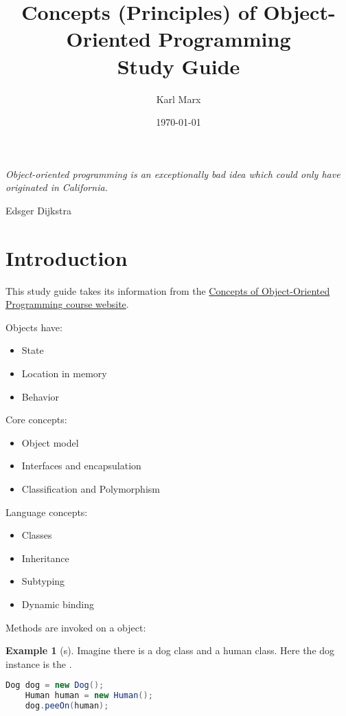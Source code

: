 \documentclass{article}
\title{Concepts (Principles) of Object-Oriented Programming \\ Study Guide}
\author{Karl Marx}
\date{\today}
\begin{document}
\theoremstyle{definition}
\newtheorem{definition}{Definition}[section]

\newtheorem{example}{Example}[section]

\maketitle

\epigraph{\itshape Object-oriented programming is an exceptionally bad idea which could only have originated in California.}{Edsger Dijkstra}

\tableofcontents

\section{Introduction}

This study guide takes its information from the \href{https://www.pm.inf.ethz.ch/education/courses/COOP.html}{Concepts of Object-Oriented Programming course website}.

Objects have:
\begin{itemize}
    \item State
    \item Location in memory
    \item Behavior
\end{itemize}

Core concepts:
\begin{itemize}
    \item Object model
    \item Interfaces and encapsulation
    \item Classification and Polymorphism
\end{itemize}

Language concepts:
\begin{itemize}
    \item Classes
    \item Inheritance
    \item Subtyping
    \item Dynamic binding
\end{itemize}

Methods are invoked on a \receiver{} object:
\begin{example}[\receiver{}s]
Imagine there is a dog class and a human class. Here the dog instance is the \receiver{}.
\begin{lstlisting}[language=Java, escapechar=|]
    Dog dog = new Dog();
    Human human = new Human();
    dog.peeOn(human);
\end{lstlisting}
\end{example}
\end{document}
